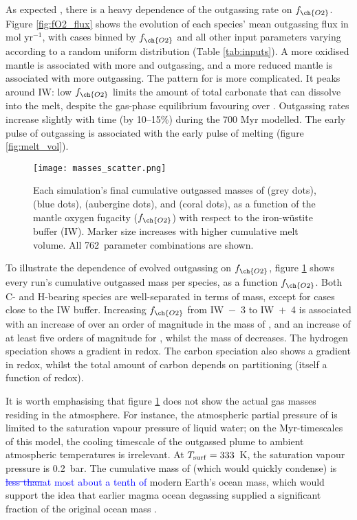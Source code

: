 \documentclass[3p,authoryear]{elsarticle}
\newcommand{\editthree}[2]{\textcolor{blue}{\sout{#1}#2}}
\newcommand{\Ncases}{762}
\begin{document}
As expected \citep{Holland1984, Kasting1993}, there is a heavy dependence of the outgassing rate on $f_{\ch{O2}}$. Figure \ref{fig:fO2_flux} shows the evolution of each species' mean outgassing flux in mol yr$^{-1}$, with cases binned by $f_{\ch{O2}}$ and all other input parameters varying according to a random uniform distribution (Table \ref{tab:inputs}). A more oxidised mantle is associated with more  and  outgassing, and a more reduced mantle is associated with more  outgassing. The pattern for  is more complicated. It peaks around IW: low $f_{\ch{O2}}$ limits the amount of total carbonate that can dissolve into the melt, despite the gas-phase equilibrium favouring  over . Outgassing rates increase slightly with time (by 10--15\%) during the 700 Myr modelled. The early pulse of outgassing is associated with the early pulse of melting (figure \ref{fig:melt_vol}). 


\begin{figure}
    \centering
    \texttt{[image: masses\_scatter.png]}
    \caption{Each simulation's final cumulative outgassed masses of  (grey dots),  (blue dots),  (aubergine dots), and  (coral dots), as a function of the mantle oxygen fugacity ($f_{\ch{O2}}$) with respect to the iron-w\"ustite buffer (IW). Marker size increases with higher cumulative melt volume. All \Ncases~parameter combinations are shown.}
    \label{fig:fO2_scatter}
\end{figure}


To illustrate the dependence of evolved outgassing on $f_{\ch{O2}}$, figure \ref{fig:fO2_scatter} shows every run's cumulative outgassed mass per species, as a function $f_{\ch{O2}}$. Both C- and H-bearing species are well-separated in terms of mass, except for cases close to the IW buffer. Increasing $f_{\ch{O2}}$ from IW~$-$~3 to IW~$+$~4 is associated with an increase of over an order of magnitude in the mass of , and an increase of at least five orders of magnitude for , whilst the mass of  decreases. The hydrogen speciation shows a gradient in redox. The carbon speciation also shows a gradient in redox, whilst the total amount of carbon depends on partitioning (itself a function of redox).

It is worth emphasising that figure \ref{fig:fO2_scatter} does not show the actual gas masses residing in the atmosphere. For instance, the atmospheric partial pressure of  is limited to the saturation vapour pressure of liquid water; on the Myr-timescales of this model, the cooling timescale of the outgassed plume to ambient atmospheric temperatures is irrelevant. At $T_{\rm surf} = 333$~K, the saturation vapour pressure is 0.2~bar. The cumulative mass of  (which would quickly condense) is \editthree{less than}{at most about a tenth of} modern Earth's ocean mass, which would support the idea that earlier magma ocean degassing supplied a significant fraction of the original ocean mass \citep{Pahlevan2019}.
\end{document}

